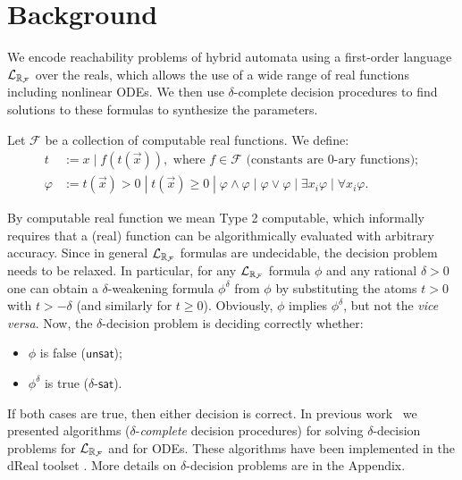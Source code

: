 \section{Background}
We encode reachability problems of hybrid automata using a first-order language $\mathcal{L}_{\mathbb{R}_{\mathcal{F}}}$ over the reals, 
which allows the use of a wide range of real functions including nonlinear ODEs. 
We then use $\delta$-complete decision procedures to find solutions to these formulas to synthesize 
the parameters. 

\begin{definition}
Let $\mathcal{F}$ be a collection of computable real functions. We define:
\begin{align*}
t& := x \; | \; f(t(\vec x)), \mbox{ where }f\in \mathcal{F} \mbox{ (constants are 0-ary functions)};\\
\varphi& := t(\vec x)> 0 \; | \; t(\vec x)\geq 0 \; | \; \varphi\wedge\varphi
\; | \; \varphi\vee\varphi \; | \; \exists x_i\varphi \; |\; \forall x_i\varphi.
\end{align*}
\end{definition}
By computable real function we mean Type 2 computable, which informally requires that a (real) 
function can be algorithmically evaluated with arbitrary accuracy. Since in general 
$\mathcal{L}_{\mathbb{R}_{\mathcal{F}}}$ formulas are undecidable, the decision problem needs to be relaxed. In particular, for 
any $\mathcal{L}_{\mathbb{R}_{\mathcal{F}}}$ formula $\phi$ and any rational $\delta >0$ one can obtain a $\delta$-weakening 
formula $\phi^\delta$ from $\phi$ by substituting the atoms $t > 0$ with $t > -\delta$ (and
similarly for $t \geq 0$). Obviously, $\phi$ implies $\phi^\delta$, but not the {\em vice versa}.
Now, the $\delta$-decision problem is deciding correctly whether:
\begin{itemize}
	\item $\phi$ is false ($\mathsf{unsat}$);
	\item $\phi^\delta$ is true ($\delta$-$\mathsf{sat}$).
\end{itemize}
If both cases are true, then either decision is correct. In previous work~\cite{gao12a,gao12b,gao13}
we presented algorithms ($\delta$-{\em complete} decision procedures) for solving $\delta$-decision 
problems for $\mathcal{L}_{\mathbb{R}_{\mathcal{F}}}$ and for ODEs. These algorithms have been implemented in the dReal 
toolset \cite{dreal}. More details on $\delta$-decision problems are in the Appendix. 

